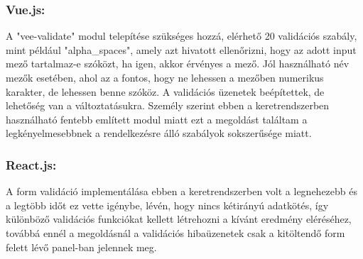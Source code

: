\subsubsection{Vue.js:} A "vee-validate" modul telepítése szükséges hozzá, elérhető 20 validációs szabály, mint például "alpha\_spaces", amely azt hivatott ellenőrizni, hogy az adott input mező tartalmaz-e szóközt, ha igen, akkor érvényes a mező. Jól használható név mezők esetében, ahol az a fontos, hogy ne lehessen a mezőben numerikus karakter, de lehessen benne szóköz. A validációs üzenetek beépítettek, de lehetőség van a változtatásukra. Személy szerint ebben a keretrendszerben használható fentebb említett modul miatt ezt a megoldást találtam a legkényelmesebbnek a rendelkezésre álló szabályok sokszerűsége miatt.\\
\subsubsection{React.js:} A form validáció implementálása ebben a keretrendszerben volt a legnehezebb és a legtöbb időt ez vette igénybe, lévén, hogy nincs kétirányú adatkötés, így különböző validációs funkciókat kellett létrehozni a kívánt eredmény eléréséhez, továbbá ennél a megoldásnál a validációs hibaüzenetek csak a kitöltendő form felett lévő panel-ban jelennek meg.\\
